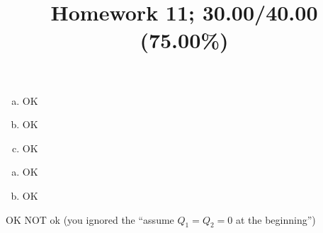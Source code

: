 \documentclass[10pt]{article} %
\title{Homework 11;
30.00/40.00 (75.00\%)
}
\begin{document}
\maketitle
{}
\begin{enumerate}[(a)]
	\item OK
	\item OK
	\item OK
\end{enumerate}
\begin{enumerate}[(a)]
	\item OK
	\item OK
\end{enumerate}
OK
NOT ok (you ignored the ``assume $Q_1=Q_2=0$ at the beginning'')
\end{document}
